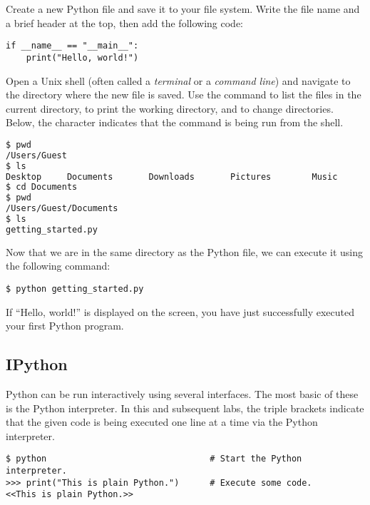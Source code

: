 
\begin{problem} %
Create a new Python file and save it to your file system.
Write the file name and a brief header at the top, then add the following code:
\begin{lstlisting}
if __name__ == "__main__":
    print("Hello, world!")
\end{lstlisting}
Open a Unix shell (often called a \emph{terminal} or a \emph{command line}) and navigate to the directory where the new file is saved.
Use the command  to list the files in the current directory,  to print the working directory, and  to change directories.
Below, the \li{\$} character indicates that the command is being run from the shell.

\begin{lstlisting}[language=bash]
$ pwd
/Users/Guest
$ ls
Desktop     Documents       Downloads       Pictures        Music
$ cd Documents
$ pwd
/Users/Guest/Documents
$ ls
getting_started.py
\end{lstlisting}
Now that we are in the same directory as the Python file, we can execute it using the following command:

\begin{lstlisting}
$ python getting_started.py
\end{lstlisting}

If ``Hello, world!'' is displayed on the screen, you have just successfully executed your first Python program.
\label{prob:helloWorld}
\end{problem}

\subsection*{IPython} %

Python can be run interactively using several interfaces.
The most basic of these is the Python interpreter.
In this and subsequent labs, the triple brackets \li{>>>} indicate that the given code is being executed one line at a time via the Python interpreter.

\begin{lstlisting}
$ python                                # Start the Python interpreter.
>>> print("This is plain Python.")      # Execute some code.
<<This is plain Python.>>
\end{lstlisting}

